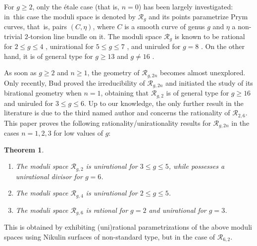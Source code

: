 \documentclass[JEP,XML,SOM,Unicode,NoEqCountersInSection,published]{cedram}
\newenvironment{enumeratea}
{\bgroup\def\theenumi{\alph{enumi}}\begin{enumerate}}
{\end{enumerate}\egroup}
\renewcommand{\theenumi}{\roman{enumi}}
\theoremstyle{plain}
\newtheorem{thm}{Theorem}[section]
\theoremstyle{definition}
\newcommand\R{{\mathcal R}}
\begin{document}
For $g\geq 2$, only the étale case (that is, $n=0$) has been largely investigated: in~this case the moduli space is denoted by $\R_g$ and its points parametrize Prym curves, that~is, pairs $(C,\eta)$, where $C$ is a smooth curve of genus $g$ and $\eta$ a non-trivial $2$\nobreakdash-torsion line bundle on it. The moduli space $\R_g$ is known to be rational for $2\leq g\leq 4$ \cite{Do2,Ca}, unirational for $5\leq g\leq 7$ \cite{Don,ILS,V1,V2,FV1,FV2}, and uniruled for $g=8$ \cite{FV2}. On the other hand, it is of general type for $g\geq 13$ and $g\neq 16$ \cite{FL,Br}.

As soon as $g\geq 2$ and $n\geq 1$, the geometry of $\mathcal R_{g,2n}$ becomes almost unexplored. Only recently, Bud \cite{Bu} proved the irreducibility of $\mathcal R_{g,2n}$ and initiated the study of its birational geometry when $n=1$, obtaining that $\mathcal R_{g,2}$ is of general type for $g\geq 16$ and uniruled for $3\leq g\leq 6$. Up to our knowledge, the only further result in the literature is due to the third named author \cite{NOV} and concerns the rationality of $\R_{2,6}$. This paper proves the following rationality/unirationality results for $\mathcal R_{g,2n}$ in the cases $n=1,2,3$ for low values of $g$:

\skpt
\begin{thm}\label{pescara}
\begin{enumeratea}
\item
The moduli space $\R_{g,2}$ is unirational for $3\leq g\leq 5$, while possesses a unirational divisor for $g=6$. 
\item
The moduli space $\R_{g,4}$ is unirational for $2\leq g\leq 5$.
\item
The moduli space $\R_{g,6}$ is rational for $g=2$ and unirational for $g=3$. 
\end{enumeratea}
\end{thm}

This is obtained by exhibiting (uni)rational parametrizations of the above moduli spaces using Nikulin surfaces of non-standard type, but in the case of $\mathcal R_{6,2}$.
\end{document}
